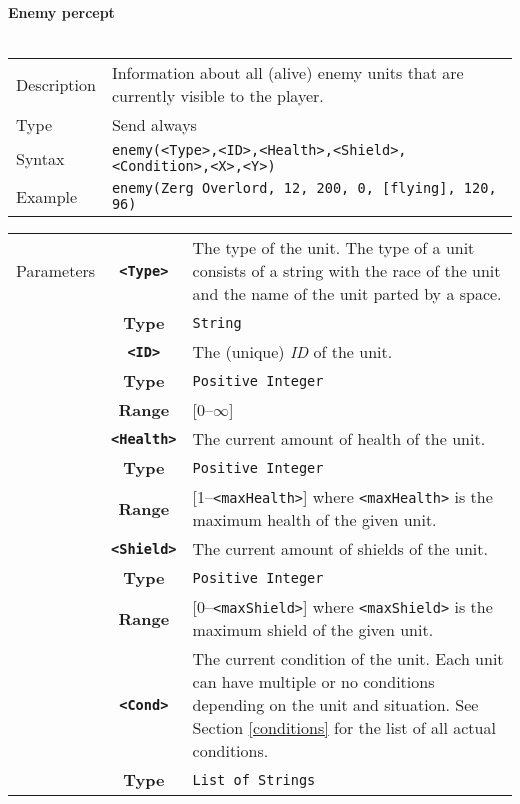 \noindent
\textbf{Enemy percept}\\
\\
\begin{tabularx}{\textwidth}{lX}
 Description & Information about all (alive) enemy units that are currently visible to the player. \\
 Type & Send always \\
 Syntax & \verb|enemy(<Type>,<ID>,<Health>,<Shield>,<Condition>,<X>,<Y>)| \\
 Example & \verb|enemy(Zerg Overlord, 12, 200, 0, [flying], 120, 96)| \\
 \end{tabularx}
 \begin{tabularx}{\textwidth}{l | c | p{8cm}|}
 \cline{2-3}
 Parameters & \textbf{\verb|<Type>|} & The type of the unit. The type of a unit consists of a string with the race of            the unit and the name of the unit parted by a space. \\
            & \textbf{Type} & \verb|String| \\
            \cline{2-3}
            & \textbf{\verb|<ID>|} & The (unique) \textit{ID} of the unit.\\
            & \textbf{Type} & \verb|Positive Integer| \\
            & \textbf{Range} & [0--$\infty$] \\
            \cline{2-3}
            & \textbf{\verb|<Health>|} & The current amount of health of the unit.\\
            & \textbf{Type} & \verb|Positive Integer| \\
            & \textbf{Range} & [1--\verb|<maxHealth>|] where \verb|<maxHealth>| is the maximum health of the given unit.\\
            \cline{2-3}
            & \textbf{\verb|<Shield>|} & The current amount of shields of the unit. \\
            & \textbf{Type} & \verb|Positive Integer| \\
            & \textbf{Range} & [0--\verb|<maxShield>|] where \verb|<maxShield>| is the maximum shield of the given unit. \\
            \cline{2-3}
            & \textbf{\verb|<Cond>|} & The current condition of the unit. Each unit can have multiple or no conditions depending on the unit and situation. See Section \ref{conditions} for the list of all actual conditions.\\
            & \textbf{Type} & \verb|List of Strings| \\

\end{tabularx}
